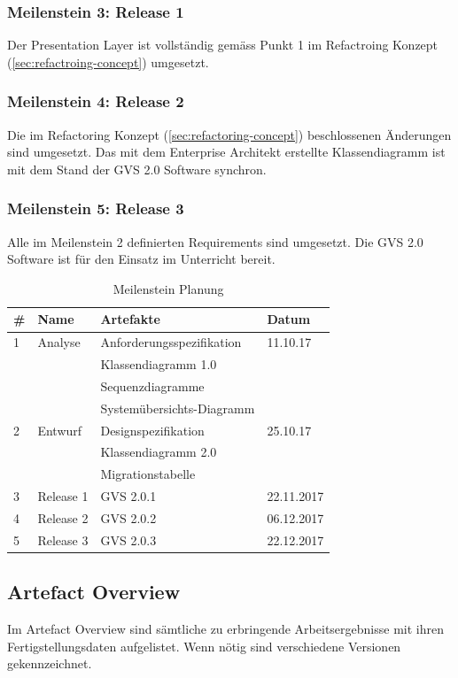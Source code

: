\documentclass[11pt,a4paper,english,oneside]{book}
\numberwithin{equation}{chapter}
\begin{document}
	\subsubsection{Meilenstein 3: Release 1}
	Der Presentation Layer ist vollständig gemäss Punkt 1 im Refactroing Konzept (\ref{sec:refactroing-concept}) umgesetzt.
	
	\subsubsection{Meilenstein 4: Release 2}
	Die im Refactoring Konzept (\ref{sec:refactoring-concept}) beschlossenen Änderungen sind umgesetzt. Das mit dem Enterprise Architekt erstellte Klassendiagramm ist mit dem Stand der GVS 2.0 Software synchron.
	
	\subsubsection{Meilenstein 5: Release 3}
	Alle im Meilenstein 2 definierten Requirements sind umgesetzt. Die GVS 2.0 Software ist für den Einsatz im Unterricht bereit.
	
	\begin{table}[h!]
		\centering
		\begin{tabular}{l l l l}
			\toprule 
			\# & Name & Artefakte & Datum \\
			\toprule 
			1 & Analyse & Anforderungsspezifikation & 11.10.17 \\
			& & Klassendiagramm 1.0 & \\
			& & Sequenzdiagramme & \\
			& &  Systemübersichts-Diagramm & \\
			\midrule
			2 & Entwurf  & Designspezifikation & 25.10.17\\
			& & Klassendiagramm 2.0 & \\
			& & Migrationstabelle & \\
			\midrule
			3 & Release 1 & GVS 2.0.1 & 22.11.2017 \\
			\midrule
			4 & Release 2 & GVS 2.0.2 & 06.12.2017 \\
			\midrule
			5 & Release 3 & GVS 2.0.3 & 22.12.2017 \\
			\bottomrule 
		\end{tabular} 
		\caption{Meilenstein Planung} 
	\end{table}
	
	\subsection{Artefact Overview}
	Im Artefact Overview sind sämtliche zu erbringende Arbeitsergebnisse mit ihren Fertigstellungsdaten aufgelistet. Wenn nötig sind verschiedene Versionen gekennzeichnet.
	
	
\end{document}
